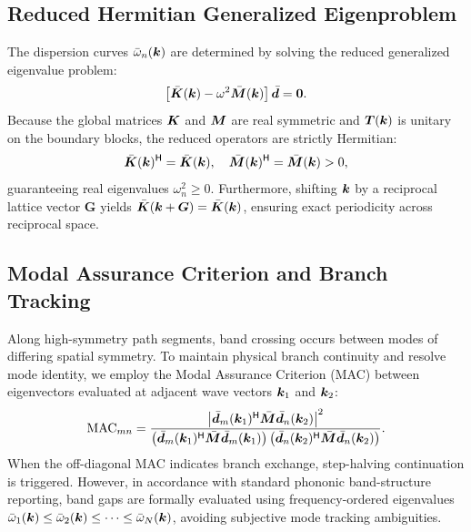 \subsection{Reduced Hermitian Generalized Eigenproblem}
The dispersion curves $\bar{\omega}_n(\bm{k})$ are determined by solving the reduced generalized eigenvalue problem:
\begin{equation}
\left[ \bar{\bm{K}}(\bm{k}) - \omega^2 \bar{\bm{M}}(\bm{k}) \right] \bar{\bm{d}} = \bm{0}.
\label{eq:eigenproblem}
\end{equation}
Because the global matrices $\bm{K}$ and $\bm{M}$ are real symmetric and $\bm{T}(\bm{k})$ is unitary on the boundary blocks, the reduced operators are strictly Hermitian:
\begin{equation}
\bar{\bm{K}}(\bm{k})^\mathsf{H} = \bar{\bm{K}}(\bm{k}), \quad \bar{\bm{M}}(\bm{k})^\mathsf{H} = \bar{\bm{M}}(\bm{k}) > 0,
\label{eq:hermiticity}
\end{equation}
guaranteeing real eigenvalues $\omega_n^2 \ge 0$. Furthermore, shifting $\bm{k}$ by a reciprocal lattice vector $\bm{G}$ yields $\bar{\bm{K}}(\bm{k} + \bm{G}) = \bar{\bm{K}}(\bm{k})$, ensuring exact periodicity across reciprocal space.

\subsection{Modal Assurance Criterion and Branch Tracking}
Along high-symmetry path segments, band crossing occurs between modes of differing spatial symmetry. To maintain physical branch continuity and resolve mode identity, we employ the Modal Assurance Criterion (MAC) between eigenvectors evaluated at adjacent wave vectors $\bm{k}_1$ and $\bm{k}_2$:
\begin{equation}
\mathrm{MAC}_{mn} = \frac{\left| \bar{\bm{d}}_m(\bm{k}_1)^\mathsf{H} \bar{\bm{M}} \bar{\bm{d}}_n(\bm{k}_2) \right|^2}{\left( \bar{\bm{d}}_m(\bm{k}_1)^\mathsf{H} \bar{\bm{M}} \bar{\bm{d}}_m(\bm{k}_1) \right) \left( \bar{\bm{d}}_n(\bm{k}_2)^\mathsf{H} \bar{\bm{M}} \bar{\bm{d}}_n(\bm{k}_2) \right)}.
\label{eq:mac_def}
\end{equation}
When the off-diagonal MAC indicates branch exchange, step-halving continuation is triggered. However, in accordance with standard phononic band-structure reporting, band gaps are formally evaluated using frequency-ordered eigenvalues $\bar{\omega}_1(\bm{k}) \le \bar{\omega}_2(\bm{k}) \le \dots \le \bar{\omega}_N(\bm{k})$, avoiding subjective mode tracking ambiguities.
